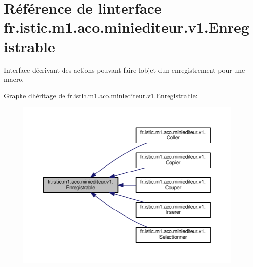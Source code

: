 \hypertarget{interfacefr_1_1istic_1_1m1_1_1aco_1_1miniediteur_1_1v1_1_1Enregistrable}{}\section{Référence de l\textquotesingle{}interface fr.\+istic.\+m1.\+aco.\+miniediteur.\+v1.\+Enregistrable}
\label{interfacefr_1_1istic_1_1m1_1_1aco_1_1miniediteur_1_1v1_1_1Enregistrable}


Interface décrivant des actions pouvant faire l\textquotesingle{}objet d\textquotesingle{}un enregistrement pour une macro.  




Graphe d\textquotesingle{}héritage de fr.\+istic.\+m1.\+aco.\+miniediteur.\+v1.\+Enregistrable\+:
\nopagebreak
\begin{figure}[H]
\begin{center}
\leavevmode
\includegraphics[width=350pt]{interfacefr_1_1istic_1_1m1_1_1aco_1_1miniediteur_1_1v1_1_1Enregistrable__inherit__graph}
\end{center}
\end{figure}

